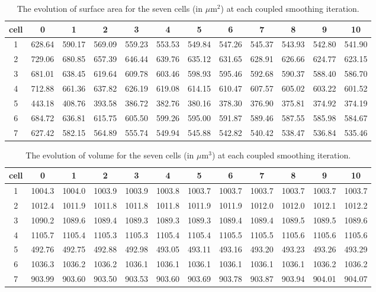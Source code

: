 \documentclass[a4paper,10pt]{article}
\begin{document}
\begin{table}[H]
\begin{center}
\footnotesize
\begin{tabular}{|c|ccccccccccc|}
\hline
cell & 0 &1 &2 &3 &4 &5 &6 &7 &8 &9 &10\\
\hline
1 &628.64 &590.17 &569.09 &559.23 &553.53 &549.84 &547.26 &545.37 &543.93 &542.80 &541.90\\
2 &729.06 &680.85 &657.39 &646.44 &639.76 &635.12 &631.65 &628.91 &626.66 &624.77 &623.15\\
3 &681.01 &638.45 &619.64 &609.78 &603.46 &598.93 &595.46 &592.68 &590.37 &588.40 &586.70\\
4 &712.88 &661.36 &637.82 &626.19 &619.08 &614.15 &610.47 &607.57 &605.02 &603.22 &601.52\\
5 &443.18 &408.76 &393.58 &386.72 &382.76 &380.16 &378.30 &376.90 &375.81 &374.92 &374.19\\
6 &684.72 &636.81 &615.75 &605.50 &599.26 &595.00 &591.87 &589.46 &587.55 &585.98 &584.67\\
7 &627.42 &582.15 &564.89 &555.74 &549.94 &545.88 &542.82 &540.42 &538.47 &536.84 &535.46\\
\hline
\end{tabular}
\end{center}
\caption{The evolution of surface area for the seven cells (in $\mu \text{m}^2$)  at each coupled smoothing iteration.}
\label{tab:surf}
\end{table}

\begin{table}[H]
\begin{center}
\footnotesize
\begin{tabular}{|c|ccccccccccc|}
\hline
cell & 0 &1 &2 &3 &4 &5 &6 &7 &8 &9 &10\\
\hline
1 &1004.3 &1004.0 &1003.9 &1003.9 &1003.8 &1003.7 &1003.7 &1003.7 &1003.7 &1003.7 &1003.7\\
2 &1012.4 &1011.9 &1011.8 &1011.8 &1011.8 &1011.9 &1011.9 &1012.0 &1012.0 &1012.1 &1012.2\\
3 &1090.2 &1089.6 &1089.4 &1089.3 &1089.3 &1089.3 &1089.4 &1089.4 &1089.5 &1089.5 &1089.6\\
4 &1105.7 &1105.4 &1105.3 &1105.3 &1105.4 &1105.4 &1105.5 &1105.5 &1105.6 &1105.6 &1105.6\\
5 &492.76 &492.75 &492.88 &492.98 &493.05 &493.11 &493.16 &493.20 &493.23 &493.26 &493.29\\
6 &1036.3 &1036.2 &1036.2 &1036.1 &1036.1 &1036.1 &1036.1 &1036.1 &1036.1 &1036.2 &1036.2\\
7 &903.99 &903.60 &903.50 &903.53 &903.60 &903.69 &903.78 &903.87 &903.94 &904.01 &904.07\\
\hline
\end{tabular}
\end{center}
\caption{The evolution of volume for the seven cells (in $\mu \text{m}^3$)  at each coupled smoothing iteration.}
\label{tab:vol}
\end{table}
\end{document}

